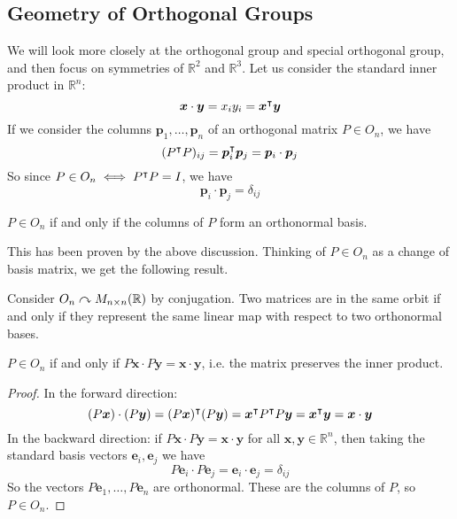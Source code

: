 \documentclass{article}
\begin{document}
	\subsection{Geometry of Orthogonal Groups}
	We will look more closely at the orthogonal group and special orthogonal group, and then focus on symmetries of $\mathbb R^2$ and $\mathbb R^3$. Let us consider the standard inner product in $\mathbb R^n$:
	\[ \bm x \cdot \bm y = x_iy_i = \bm x^\intercal \bm y \]
	If we consider the columns $\bm p_1, \dots, \bm p_n$ of an orthogonal matrix $P \in O_n$, we have
	\[ (P^\intercal P)_{ij} = \bm p_i^\intercal \bm p_j = \bm p_i \cdot \bm p_j \]
	So since $P \in O_n \iff P^\intercal P = I$, we have
	\[ \bm p_i \cdot \bm p_j = \delta_{ij} \]
	\begin{proposition}
		$P \in O_n$ if and only if the columns of $P$ form an orthonormal basis.
	\end{proposition}
	This has been proven by the above discussion. Thinking of $P \in O_n$ as a change of basis matrix, we get the following result.
	\begin{proposition}
		Consider $O_n \curvearrowright M_{n \times n}(\mathbb R)$ by conjugation. Two matrices are in the same orbit if and only if they represent the same linear map with respect to two orthonormal bases.
	\end{proposition}
	\begin{proposition}
		$P \in O_n$ if and only if $P \bm x \cdot P \bm y = \bm x \cdot \bm y$, i.e. the matrix preserves the inner product.
	\end{proposition}
	\begin{proof}
		In the forward direction:
		\[ (P\bm x) \cdot (P \bm y) = (P \bm x)^\intercal (P \bm y) = \bm x^\intercal P^\intercal P \bm y = \bm x^\intercal \bm y = \bm x \cdot \bm y \]
		In the backward direction: if $P\bm x \cdot P\bm y = \bm x \cdot \bm y$ for all $\bm x, \bm y \in \mathbb R^n$, then taking the standard basis vectors $\bm e_i, \bm e_j$ we have
		\[ P\bm e_i \cdot P\bm e_j = \bm e_i \cdot \bm e_j = \delta_{ij} \]
		So the vectors $P\bm e_1, \dots, P\bm e_n$ are orthonormal. These are the columns of $P$, so $P \in O_n$. 
	\end{proof}
\end{document}
